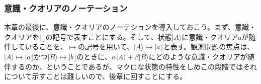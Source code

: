\subsubsection{意識・クオリアのノーテーション}
本章の最後に、意識・クオリアのノーテションを導入しておこう。まず、意識・クオリアを$|\,\rfloor$の記号で表すことにする。そして、状態$|A\rangle$に意識・クオリアaが随伴していることを、$\mapsto$の記号を用いて、$|A\rangle \mapsto |a \rfloor$と表す。観測問題の焦点は、$|A\rangle \mapsto |a \rfloor$かつ$|B\rangle \mapsto |b \rfloor$のときに、$\alpha|A\rangle + \beta|B\rangle$にどのような意識・クオリアが随伴するのか、ということであるが、マクロな状態の特性をしめこの段階ではそれについて示すことは難しいので、後章に回すことにする。
